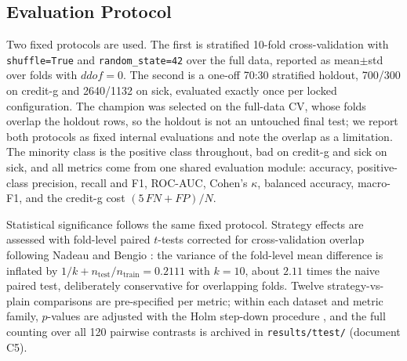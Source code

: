 \subsection{Evaluation Protocol}
Two fixed protocols are used. The first is stratified 10-fold
cross-validation with \texttt{shuffle=True} and
\texttt{random\_state=42} over the full data, reported as
mean$\pm$std over folds with $ddof=0$. The second is a one-off 70:30
stratified holdout, 700/300 on credit-g and 2640/1132 on sick,
evaluated exactly once per locked configuration. The champion was selected on the full-data CV, whose folds overlap the holdout rows, so the holdout is not an untouched final test; we report both protocols as fixed internal evaluations and note the overlap as a limitation. The minority class is the positive class
throughout, bad on credit-g and sick on sick, and all metrics come
from one shared evaluation module: accuracy, positive-class
precision, recall and F1, ROC-AUC, Cohen's $\kappa$, balanced
accuracy, macro-F1, and the credit-g cost
$(5\,\mathit{FN}+\mathit{FP})/N$.

Statistical significance follows the same fixed protocol. Strategy
effects are assessed with fold-level paired $t$-tests corrected for
cross-validation overlap following Nadeau and Bengio
\cite{nadeau2003inference}: the variance of the fold-level mean
difference is inflated by $1/k + n_{\text{test}}/n_{\text{train}} =
0.2111$ with $k=10$, about $2.11$ times the naive paired test, deliberately conservative for overlapping folds. Twelve
strategy-vs-plain comparisons are pre-specified per metric; within
each dataset and metric family, $p$-values are adjusted with the Holm
step-down procedure \cite{holm1979simple}, and the full counting over
all 120 pairwise contrasts is archived in \texttt{results/ttest/}
(document C5).
